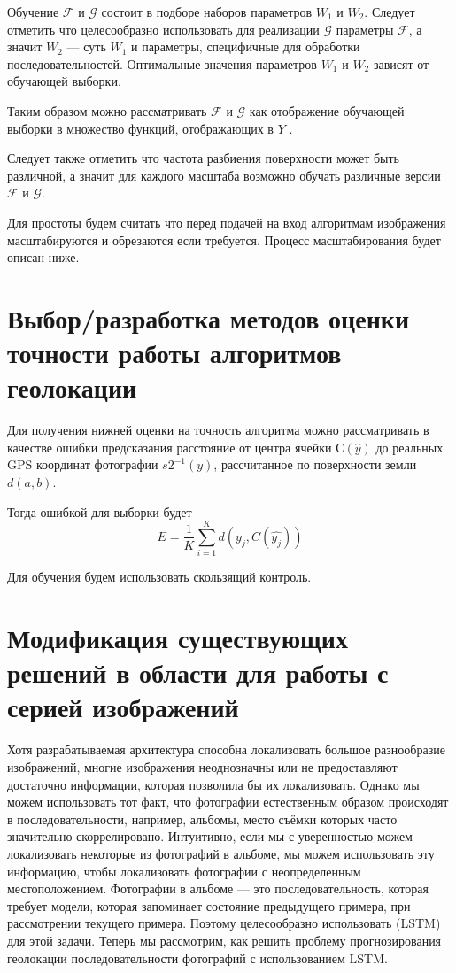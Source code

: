 Обучение $ \mathcal{F} $ и $ \mathcal{G} $ состоит в подборе наборов параметров $ W_1 $ и $ W_2 $. Следует отметить что целесообразно использовать для реализации $ \mathcal{G} $ параметры $ \mathcal{F} $, а значит $ W_2 $ --- суть $ W_1 $ и параметры, специфичные для обработки последовательностей. Оптимальные значения параметров $ W_1 $ и $ W_2$ зависят от обучающей выборки.

Таким образом можно рассматривать $ \mathcal{F} $ и $ \mathcal{G} $
как отображение обучающей выборки в множество функций, отображающих в $ Y $ .

Следует также отметить что частота разбиения поверхности может быть различной, а значит для каждого масштаба возможно обучать различные версии $ \mathcal{F}  $ и $ \mathcal{G} $.

Для простоты будем считать что перед подачей на вход алгоритмам изображения масштабируются и обрезаются если требуется. Процесс масштабирования будет описан ниже.

\section{Выбор/разработка методов оценки точности работы алгоритмов геолокации}

Для получения нижней оценки на точность алгоритма можно рассматривать в качестве ошибки предсказания расстояние от центра ячейки $ С(\hat{y}) $ до реальных GPS координат фотографии $ s2^{-1}(y) $, рассчитанное по поверхности земли $ d(a,b) $.

Тогда ошибкой для выборки будет
$$ E = \frac{1}{K} \sum_{i=1}^{K} {d(y_{j},C(\hat{y_j}))}$$

Для обучения будем использовать скользящий контроль.


\section{Модификация существующих решений в области для работы с серией изображений}

Хотя разрабатываемая архитектура способна локализовать большое разнообразие изображений, многие изображения неоднозначны или не предоставляют достаточно информации, которая позволила бы их локализовать.
Однако мы можем использовать тот факт, что фотографии естественным образом происходят в последовательности, например, альбомы, место съёмки которых часто значительно скоррелировано. Интуитивно, если мы с уверенностью можем локализовать
некоторые из фотографий в альбоме, мы можем использовать эту информацию,
чтобы локализовать фотографии с неопределенным местоположением. Фотографии в альбоме --- это последовательность,
которая требует модели, которая запоминает состояние предыдущего примера, 
при рассмотрении текущего примера. Поэтому целесообразно использовать
(LSTM) \cite{hochreiter1997long} для этой задачи.
Теперь мы рассмотрим, как решить проблему прогнозирования
геолокации последовательности фотографий с использованием LSTM.


